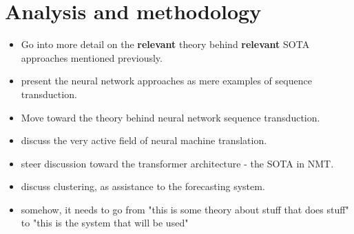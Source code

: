 \chapter{Analysis and methodology}
\begin{itemize}
	\item Go into more detail on the \textbf{relevant} theory behind \textbf{relevant} SOTA approaches mentioned previously.
	\item present the neural network approaches as mere examples of sequence transduction.
	\item Move toward the theory behind neural network sequence transduction.
	\item discuss the very active field of neural machine translation.
	\item steer discussion toward the transformer architecture - the SOTA in NMT.
	\item discuss clustering, as assistance to the forecasting system.
	\item somehow, it needs to go from "this is some theory about stuff that does stuff" to "this is the system that will be used"
	
\end{itemize}